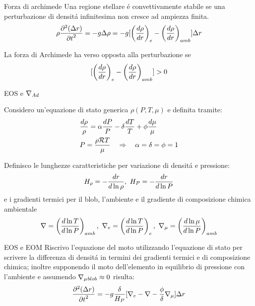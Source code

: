 \begin{wordonframe}{Forza di archimede}
Una regione stellare \'e convettivamente stabile se una perturbazione di densit\'a infinitesima non cresce ad ampiezza finita.
\begin{equation*}\label{eq:buoyancyEOM}
\rho\PtwoDy{t}{(\Delta r)}=-g\Delta\rho=-g[\Dcvar{\TDy{r}{\rho}}{e}-\Dcvar{\TDy{r}{\rho}}{amb}]\Delta r
\end{equation*}

La forza di Archimede ha verso opposta alla perturbazione se
\begin{equation*}\label{eq:Acriterion}
[\Dcvar{\TDy{r}{\rho}}{e}-\Dcvar{\TDy{r}{\rho}}{amb}]>0
\end{equation*}
\end{wordonframe}

\begin{wordonframe}{EOS e $\nad{}$}

Considero un'equazione di stato generica $\rho(P,T,\mu)$ e definita tramite:
\begin{align*}
&\frac{d\rho}{\rho}=\alpha\frac{dP}{P}-\delta\frac{dT}{T}+\phi\frac{d\mu}{\mu}\\
&P=\frac{\rho\gasconstant{}T}{\mu}\quad\Rightarrow\quad\alpha=\delta=\phi=1
\end{align*}

Definisco le lunghezze caratteristiche per variazione di densit\'a e pressione:
\begin{equation*}
\densityscale{}=-\frac{dr}{d\ln{\rho}},\ H_P=-\frac{dr}{d\ln{P}}
\end{equation*}
e i gradienti termici per il blob, l'ambiente e il gradiente di composizione chimica ambientale
\begin{equation*}
\nabla=\Dcvar{\TDly{P}{T}}{amb},\ \nabla_e=\Dcvar{\TDly{P}{T}}{e},\ \nmu{}=\Dcvar{\TDly{P}{\mu}}{amb}
\end{equation*}
\end{wordonframe}

\begin{wordonframe}{EOS e EOM}
Riscrivo l'equazione del moto utilizzando l'equazione di stato per scrivere la differenza di densit\'a in termini dei gradienti termici e di composizione chimica; inoltre supponendo il moto dell'elemento in equilibrio di pressione con l'ambiente e assumendo $\nmu{}_{blob}\approx0$ risulta:
\begin{equation*}
\PtwoDy{t}{(\Delta r)}=-g\frac{\delta}{H_P}[\nabla_e-\nabla-\frac{\phi}{\delta}\nmu{}]\Delta r
\end{equation*}

\end{wordonframe}

